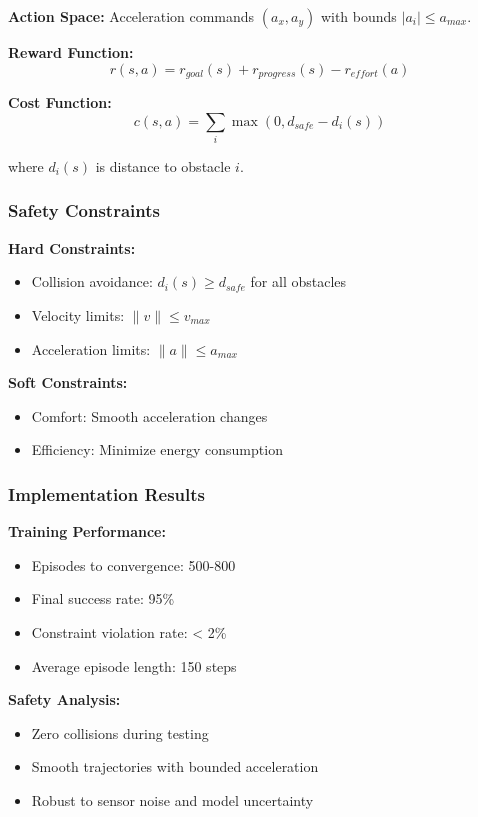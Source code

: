 \documentclass[12pt]{article}
\begin{document}
{{{{\textbf{Action Space:} Acceleration commands $(a_x, a_y)$ with bounds $|a_i| \leq a_{max}$.

\textbf{Reward Function:}
\begin{equation}
r(s,a) = r_{goal}(s) + r_{progress}(s) - r_{effort}(a)
\end{equation}

\textbf{Cost Function:}
\begin{equation}
c(s,a) = \sum_{i} \max(0, d_{safe} - d_i(s))
\end{equation}

where $d_i(s)$ is distance to obstacle $i$.

\subsubsection{Safety Constraints}

\textbf{Hard Constraints:}
\begin{itemize}
\item Collision avoidance: $d_i(s) \geq d_{safe}$ for all obstacles
\item Velocity limits: $\|v\| \leq v_{max}$
\item Acceleration limits: $\|a\| \leq a_{max}$
\end{itemize}

\textbf{Soft Constraints:}
\begin{itemize}
\item Comfort: Smooth acceleration changes
\item Efficiency: Minimize energy consumption
\end{itemize}

\subsubsection{Implementation Results}

\textbf{Training Performance:}
\begin{itemize}
\item Episodes to convergence: 500-800
\item Final success rate: 95\%
\item Constraint violation rate: < 2\%
\item Average episode length: 150 steps
\end{itemize}

\textbf{Safety Analysis:}
\begin{itemize}
\item Zero collisions during testing
\item Smooth trajectories with bounded acceleration
\item Robust to sensor noise and model uncertainty
\end{itemize}

}}}}
\end{document}
